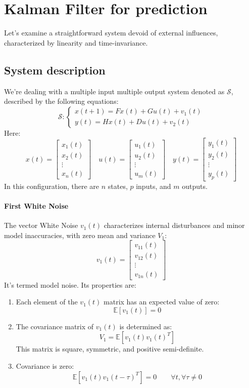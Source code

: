 \section{Kalman Filter for prediction}

Let's examine a straightforward system devoid of external influences, characterized by linearity and time-invariance.

\subsection{System description}
We're dealing with a multiple input multiple output system denoted as $\mathcal{S}$, described by the following equations:
\[\mathcal{S}:\begin{cases}
    x(t+1)=Fx(t)+Gu(t)+v_1(t) \\
    y(t)=Hx(t)+Du(t)+v_2(t)
\end{cases}\]
Here: 
\[x(t)=\begin{bmatrix} x_1(t) \\ x_2(t) \\ \vdots \\ x_n(t) \end{bmatrix} \quad u(t)=\begin{bmatrix} u_1(t) \\ u_2(t) \\ \vdots \\ u_m(t) \end{bmatrix} \quad y(t)=\begin{bmatrix} y_1(t) \\ y_2(t) \\ \vdots \\ y_p(t) \end{bmatrix}\]
In this configuration, there are $n$ states, $p$ inputs, and $m$ outputs. 

\paragraph*{First White Noise}
The vector White Noise $v_1(t)$ characterizes internal disturbances and minor model inaccuracies, with zero mean and variance $V_1$:
\[v_1(t)=\begin{bmatrix} v_{11}(t) \\ v_{12}(t) \\ \vdots \\ v_{1n}(t) \end{bmatrix}\]
It's termed model noise. 
Its properties are:
\begin{enumerate}
    \item Each element of the $v_1(t)$ matrix has an expected value of zero:
        \[\mathbb{E}\left[v_1(t)\right]=0\]
    \item The covariance matrix of $v_1(t)$ is determined as:
        \[V_1=\mathbb{E}\left[v_1(t)v_1(t)^T\right]\]
        This matrix is square, symmetric, and positive semi-definite.
    \item Covariance is zero:
        \[\mathbb{E}\left[v_1(t)v_1(t-\tau)^T\right]=0\qquad \forall t, \forall\tau\neq 0\]
\end{enumerate}

